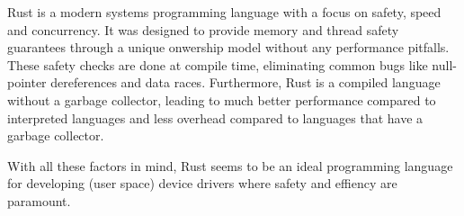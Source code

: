 Rust is a modern systems programming language with a focus on safety, speed and concurrency. It was designed to provide memory and thread safety guarantees through a unique onwership model without any performance pitfalls. These safety checks are done at compile time, eliminating common bugs like null-pointer dereferences and data races. Furthermore, Rust is a compiled language without a garbage collector, leading to much better performance compared to interpreted languages and less overhead compared to languages that have a garbage collector.

With all these factors in mind, Rust seems to be an ideal programming language for developing (user space) device drivers where safety and effiency are paramount.
